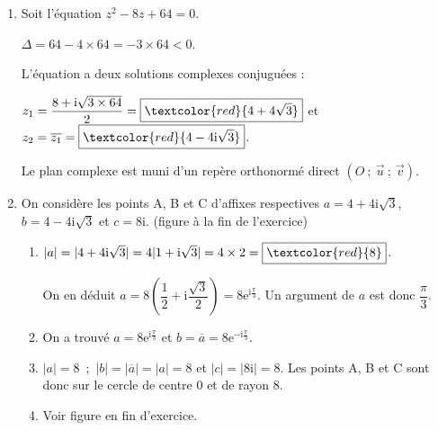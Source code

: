 \documentclass[12pt]{article}
\newcommand{\C}{\mathbb{C}}
\begin{document}
\begin{enumerate}
\item %
Soit l'équation $z^2 - 8z + 64 = 0$.

\noindent $\Delta=64-4\times 64=-3\times 64<0$.

\noindent L'équation a deux solutions complexes conjuguées :

\noindent $z_1=\dfrac{8+\mathrm{i}\sqrt{3\times 64}}{2}=\boxed{\textcolor{red}{4+4\sqrt{3}}}$ et $z_2=\overline{z_1}=\boxed{\textcolor{red}{4-4\mathrm{i}\sqrt{3}}}$.

Le plan complexe est muni d'un repère orthonormé direct $\left(O~;~\overrightarrow{u}~;~\overrightarrow{v}\right)$.

\item On considère les points A, B et C d'affixes respectives $a = 4 + 4\text{i}\sqrt{3}$,\:  \\
$b = 4 - 4\text{i}\sqrt{3}$ et $c = 8\text{i}$. (figure à la fin de l'exercice)

	\begin{enumerate}
		\item %
		$\vert a\vert=\vert 4+4\mathrm{i}\sqrt{3}\vert=4\vert1+\mathrm{i}\sqrt{3}\vert=4\times 2=\boxed{\textcolor{red}{8}}$.
		
		On en déduit $a=8\left(\dfrac{1}{2}+\mathrm{i}\dfrac{\sqrt{3}}{2}\right)=8\mathrm{e}^{\mathrm{i}\frac\pi{3}}$. Un argument de $a$ est donc $\dfrac{\pi}{3}$.
		
		\item %
		On a trouvé $a=8\mathrm{e}^{\mathrm{i}\frac\pi3}$ et  $b = \overline{a}=8\mathrm{e}^{-\mathrm{i}\frac{\pi}{3}}$.
		
		\item %
		$\vert a\vert=8$~;~$\vert b\vert=\left\vert \overline{a}\right\vert=\vert a\vert=8$ et $\vert c\vert=\vert8\mathrm{i}\vert=8$. Les points A, B et C sont donc sur le cercle de centre 0 et de rayon 8.
		
		\item %
		Voir figure en fin d'exercice.
	\end{enumerate}
\smallskip
		

\end{enumerate}
\end{document}

